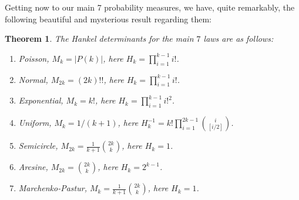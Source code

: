 \documentclass[12pt]{amsbook}
\newtheorem{theorem}{Theorem}[chapter]
\begin{document}
Getting now to our main 7 probability measures, we have, quite remarkably, the following beautiful and mysterious result regarding them:

\begin{theorem}
The Hankel determinants for the main $7$ laws are as follows:
\begin{enumerate}
\item Poisson, $M_k=|P(k)|$, here $H_k=\prod_{i=1}^{k-1}i!$.

\item Normal, $M_{2k}=(2k)!!$, here $H_k=\prod_{i=1}^{k-1}i!$.

\item Exponential, $M_k=k!$, here $H_k=\prod_{i=1}^{k-1}i!^2$. 

\item Uniform, $M_k=1/(k+1)$, here $H_k^{-1}=k!\prod_{i=1}^{2k-1}\binom{i}{[i/2]}$.

\item Semicircle, $M_{2k}=\frac{1}{k+1}\binom{2k}{k}$, here $H_k=1$.

\item Arcsine, $M_{2k}=\binom{2k}{k}$, here $H_k=2^{k-1}$.

\item Marchenko-Pastur, $M_k=\frac{1}{k+1}\binom{2k}{k}$, here $H_k=1$.
\end{enumerate}
\end{theorem}
\end{document}
